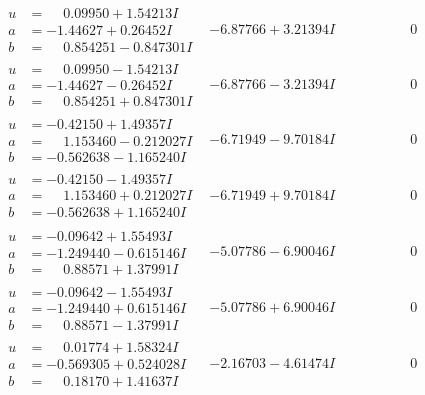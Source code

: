\documentclass[1p]{elsarticle_modified}
\theoremstyle{definition}
\begin{document}
$$\begin{array}{c|c|c}
\begin{aligned}
u &= \phantom{-}0.09950 + 1.54213 I \\
a &= -1.44627 + 0.26452 I \\
b &= \phantom{-}0.854251 - 0.847301 I\end{aligned}
 & -6.87766 + 3.21394 I & \phantom{-0.000000 } 0 \\ \hline\begin{aligned}
u &= \phantom{-}0.09950 - 1.54213 I \\
a &= -1.44627 - 0.26452 I \\
b &= \phantom{-}0.854251 + 0.847301 I\end{aligned}
 & -6.87766 - 3.21394 I & \phantom{-0.000000 } 0 \\ \hline\begin{aligned}
u &= -0.42150 + 1.49357 I \\
a &= \phantom{-}1.153460 - 0.212027 I \\
b &= -0.562638 - 1.165240 I\end{aligned}
 & -6.71949 - 9.70184 I & \phantom{-0.000000 } 0 \\ \hline\begin{aligned}
u &= -0.42150 - 1.49357 I \\
a &= \phantom{-}1.153460 + 0.212027 I \\
b &= -0.562638 + 1.165240 I\end{aligned}
 & -6.71949 + 9.70184 I & \phantom{-0.000000 } 0 \\ \hline\begin{aligned}
u &= -0.09642 + 1.55493 I \\
a &= -1.249440 - 0.615146 I \\
b &= \phantom{-}0.88571 + 1.37991 I\end{aligned}
 & -5.07786 - 6.90046 I & \phantom{-0.000000 } 0 \\ \hline\begin{aligned}
u &= -0.09642 - 1.55493 I \\
a &= -1.249440 + 0.615146 I \\
b &= \phantom{-}0.88571 - 1.37991 I\end{aligned}
 & -5.07786 + 6.90046 I & \phantom{-0.000000 } 0 \\ \hline\begin{aligned}
u &= \phantom{-}0.01774 + 1.58324 I \\
a &= -0.569305 + 0.524028 I \\
b &= \phantom{-}0.18170 + 1.41637 I\end{aligned}
 & -2.16703 - 4.61474 I & \phantom{-0.000000 } 0 \\ \hline\begin{aligned}

\end{aligned}
\end{array}$$
\end{document}
